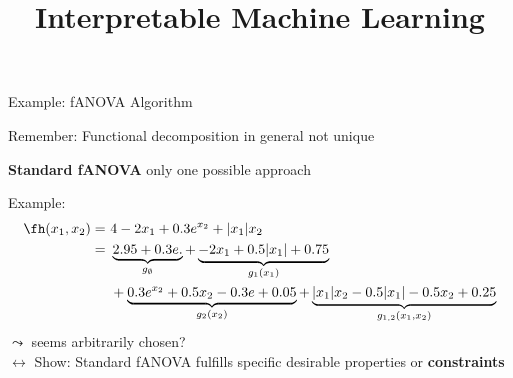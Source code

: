 \documentclass[10pt,compress,t,notes=noshow, xcolor=table]{beamer}
\title{Interpretable Machine Learning}
\begin{document}


\begin{framei}[align=top]{Example: fANOVA Algorithm}
\item Remember: Functional decomposition in general not unique
\item \textbf{Standard fANOVA} only one possible approach
\item Example:
\begin{align*}
\fh(x_1, x_2) =\,&\,4 - 2x_1 + 0.3 e^{x_2} + |x_1|x_2 \\
=\,&\,\underbrace{2.95 + 0.3 e.}_{g_\emptyset} + \underbrace{-2x_1 + 0.5|x_1| + 0.75}_{g_1(x_1)} \\
\,&\,+ \underbrace{0.3 e^{x_2} + 0.5x_2 - 0.3e + 0.05}_{g_2(x_2)} + \underbrace{|x_1| x_2 - 0.5 |x_1| - 0.5 x_2 + 0.25}_{g_{1,2}(x_1, x_2)}
\end{align*}
$\leadsto$ seems arbitrarily chosen? \\
$\longleftrightarrow$ Show: Standard fANOVA fulfills specific desirable properties or \textbf{constraints}
\end{framei}
\end{document}
